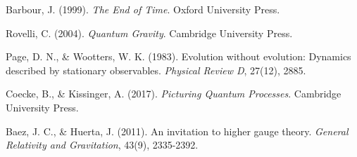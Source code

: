 \documentclass[12pt,a4paper]{article}
\begin{document}
\begin{thebibliography}{99}

Barbour, J. (1999). \textit{The End of Time}. Oxford University Press.

Rovelli, C. (2004). \textit{Quantum Gravity}. Cambridge University Press.

Page, D. N., \& Wootters, W. K. (1983). Evolution without evolution: Dynamics described by stationary observables. \textit{Physical Review D}, 27(12), 2885.

Coecke, B., \& Kissinger, A. (2017). \textit{Picturing Quantum Processes}. Cambridge University Press.

Baez, J. C., \& Huerta, J. (2011). An invitation to higher gauge theory. \textit{General Relativity and Gravitation}, 43(9), 2335-2392.

\end{thebibliography}
\end{document}

